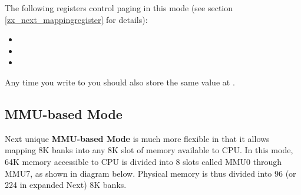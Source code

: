 The following registers control paging in this mode (see section \ref{zx_next_mappingregister} for details):

\begin{itemize}[topsep=1pt,itemsep=1pt]
    \item {}
    \item {}
    \item {}
\end{itemize}

Any time you write to  you should also store the same value at .

\pagebreak
\subsection{MMU-based Mode}
\label{zx_next_bank_mmu_mode}

Next unique \textbf{MMU-based Mode} is much more flexible in that it allows mapping 8K banks into any 8K slot of memory available to CPU. In this mode, 64K memory accessible to CPU is divided into 8 slots called MMU0 through MMU7, as shown in diagram below. Physical memory is thus divided into 96 (or 224 in expanded Next) 8K banks.

